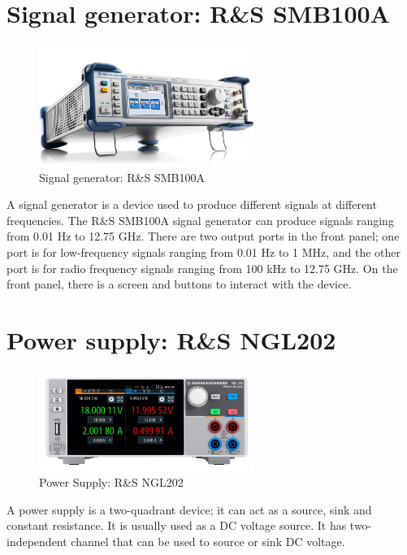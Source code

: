 \documentclass[12pt,a4paper,bold]{thesis}
\theoremstyle{thm}
\theoremstyle{definition}
\begin{document}
\section{Signal generator: R\&S SMB100A}
\begin{figure}[H]
	\centering
   \includegraphics[width=7cm]{Images/71.jpg} 
   \caption{Signal generator: R\&S SMB100A}
\end{figure}
\indent\indent\indent A signal generator is a device used to produce different signals at different frequencies. The R\&S SMB100A signal generator can produce signals ranging from 0.01 Hz to 12.75 GHz. There are two output ports in the front panel; one port is for low-frequency signals ranging from 0.01 Hz to 1 MHz, and the other port is for radio frequency signals ranging from 100 kHz to 12.75 GHz. On the front panel, there is a screen and buttons to interact with the device.
\section{Power supply: R\&S NGL202}
\begin{figure}[H]
	\centering
   \includegraphics[width=7cm]{Images/15.jpg} 
   \caption{Power Supply: R\&S NGL202}
\end{figure}
\indent\indent\indent A power supply is a two-quadrant device; it can act as a source, sink and constant resistance. It is usually used as a DC voltage source. It has two-independent channel that can be used to source or sink DC voltage.
\end{document}
